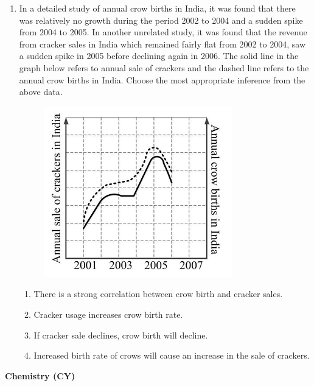 \documentclass{article}
\begin{document}
\begin{enumerate}
\item In a detailed study of annual crow births in India, it was found that there was relatively no growth during the period 2002 to 2004 and a sudden spike from 2004 to 2005.  
In another unrelated study, it was found that the revenue from cracker sales in India which remained fairly flat from 2002 to 2004, saw a sudden spike in 2005 before declining again in 2006. The solid line in the graph below refers to annual sale of crackers and the dashed line refers to the annual crow births in India. Choose the most appropriate inference from the above data.  

\begin{figure}[h]
    \centering
    \includegraphics[width=0.5\columnwidth]{figures/asg2 fig1.png}
    \label{fig:placeholder}
\end{figure}

\begin{multicols}{2}
\begin{enumerate}
\item There is a strong correlation between crow birth and cracker sales.  
\item Cracker usage increases crow birth rate.  
\item If cracker sale declines, crow birth will decline.  
\item Increased birth rate of crows will cause an increase in the sale of crackers.  
\end{enumerate}
\end{multicols}
\end{enumerate}

\maketitle
\noindent \textbf{Chemistry (CY)}
\end{document}
